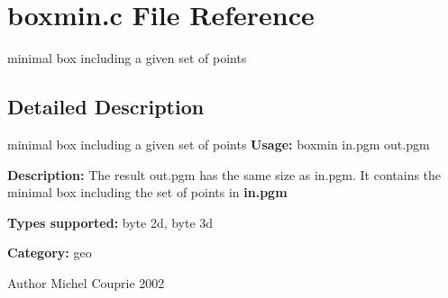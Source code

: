 \section{boxmin.c File Reference}
\label{boxmin_8c}


minimal box including a given set of points  




\subsection{Detailed Description}
minimal box including a given set of points {\bfseries Usage:} boxmin in.pgm out.pgm

{\bfseries Description:} The result out.pgm has the same size as in.pgm. It contains the minimal box including the set of points in {\bfseries in.pgm} 

{\bfseries Types supported:} byte 2d, byte 3d

{\bfseries Category:} geo

\begin{DoxyAuthor}{Author}
Michel Couprie 2002 
\end{DoxyAuthor}
